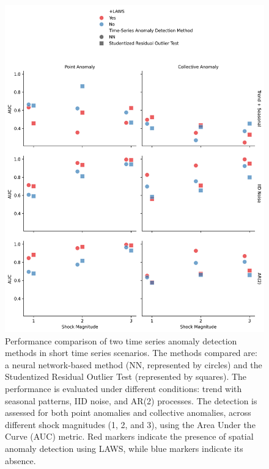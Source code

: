 \documentclass[11pt]{article}
\begin{document}
\begin{figure}[h]
    \centering
    \includegraphics[width=\textwidth]{../figure/simulation_short_time_series.png}
    \caption{Performance comparison of two time series anomaly detection methods in short time series scenarios. The methods compared are: a neural network-based method (NN, represented by circles) and the Studentized Residual Outlier Test (represented by squares). The performance is evaluated under different conditions: trend with seasonal patterns, IID noise, and AR(2) processes. The detection is assessed for both point anomalies and collective anomalies, across different shock magnitudes (1, 2, and 3), using the Area Under the Curve (AUC) metric. Red markers indicate the presence of spatial anomaly detection using LAWS, while blue markers indicate its absence.}
    \label{fig: simulation short time series}
\end{figure}
\end{document}
